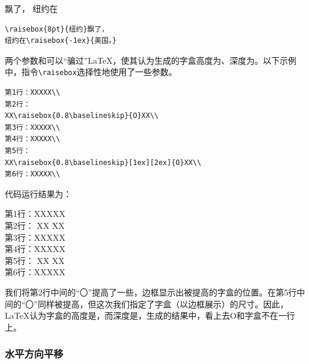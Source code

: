\begin{codelist}[4.12]{
飘了，
纽约在
}
\begin{verbatim}
\raisebox{8pt}{纽约}飘了，
纽约在\raisebox{-1ex}{美国。}\end{verbatim}
\end{codelist}

两个参数和可以“骗过”\LaTeX ，使其认为生成的字盒高度为、深度为。以下示例中，指令\verb|\raisebox|选择性地使用了一些参数。

\begin{dmd}
  \begin{verbatim}
第1行：XXXXX\\
第2行：
XX\raisebox{0.8\baselineskip}{O}XX\\
第3行：XXXXX\\
第4行：XXXXX\\
第5行：
XX\raisebox{0.8\baselineskip}[1ex][2ex]{O}XX\\ 
第6行：XXXXX\\
  \end{verbatim}
\end{dmd}

代码运行结果为：

\newcommand{\blob}{\makebox[\tmplength]{O}}

\begin{flushleft}
  第1行：XXXXX\\
  第2行：
  XX\hspace{-\fboxrule}%
  \fbox{\raisebox{0.8\baselineskip}{\blob}}%
  \hspace{-\fboxrule}XX \\
  第3行：XXXXX\\
  第4行：XXXXX\\
  第5行：
  XX\hspace{-\fboxrule}%
  \fbox{\raisebox{0.8\baselineskip}[1ex][2ex]{\blob}}%
  \hspace{-\fboxrule}XX \\
  第6行：XXXXX\\
\end{flushleft}

我们将第2行中间的“〇”提高了一些，边框显示出被提高的字盒的位置。在第5行中间的“〇”同样被提高，但这次我们指定了字盒（以边框展示）的尺寸。因此，\LaTeX 认为字盒的高度是\dm{1ex}，而深度是\dm{2ex}，生成的结果中，看上去O和字盒不在一行上。

\subsubsection{水平方向平移}

